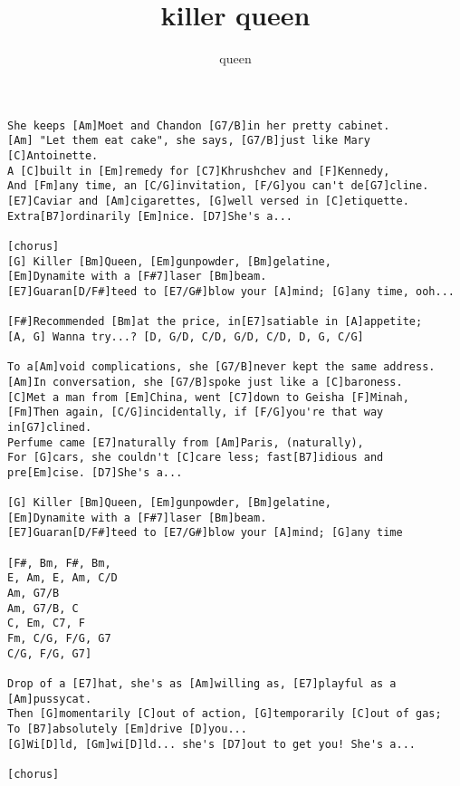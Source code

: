 \author{queen}
\title{killer queen}
\maketitle
\begin{verbatim}
She keeps [Am]Moet and Chandon [G7/B]in her pretty cabinet.
[Am] "Let them eat cake", she says, [G7/B]just like Mary [C]Antoinette.
A [C]built in [Em]remedy for [C7]Khrushchev and [F]Kennedy,
And [Fm]any time, an [C/G]invitation, [F/G]you can't de[G7]cline.
[E7]Caviar and [Am]cigarettes, [G]well versed in [C]etiquette.
Extra[B7]ordinarily [Em]nice. [D7]She's a...

[chorus]
[G] Killer [Bm]Queen, [Em]gunpowder, [Bm]gelatine,
[Em]Dynamite with a [F#7]laser [Bm]beam.
[E7]Guaran[D/F#]teed to [E7/G#]blow your [A]mind; [G]any time, ooh...

[F#]Recommended [Bm]at the price, in[E7]satiable in [A]appetite;
[A, G] Wanna try...? [D, G/D, C/D, G/D, C/D, D, G, C/G]

To a[Am]void complications, she [G7/B]never kept the same address.
[Am]In conversation, she [G7/B]spoke just like a [C]baroness.
[C]Met a man from [Em]China, went [C7]down to Geisha [F]Minah,
[Fm]Then again, [C/G]incidentally, if [F/G]you're that way in[G7]clined.
Perfume came [E7]naturally from [Am]Paris, (naturally),
For [G]cars, she couldn't [C]care less; fast[B7]idious and pre[Em]cise. [D7]She's a...

[G] Killer [Bm]Queen, [Em]gunpowder, [Bm]gelatine,
[Em]Dynamite with a [F#7]laser [Bm]beam.
[E7]Guaran[D/F#]teed to [E7/G#]blow your [A]mind; [G]any time

[F#, Bm, F#, Bm,
E, Am, E, Am, C/D
Am, G7/B
Am, G7/B, C
C, Em, C7, F
Fm, C/G, F/G, G7
C/G, F/G, G7]

Drop of a [E7]hat, she's as [Am]willing as, [E7]playful as a [Am]pussycat.
Then [G]momentarily [C]out of action, [G]temporarily [C]out of gas;
To [B7]absolutely [Em]drive [D]you...
[G]Wi[D]ld, [Gm]wi[D]ld... she's [D7]out to get you! She's a...

[chorus]
\end{verbatim}
